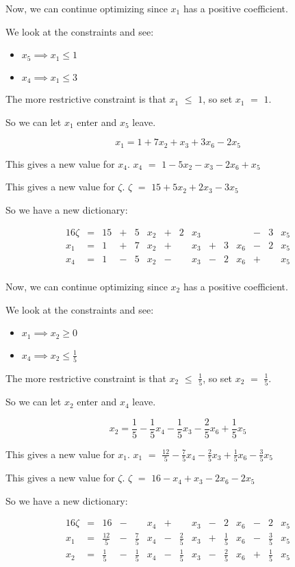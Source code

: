 \documentclass[12pt,letterpaper]{article}
\newcommand*\continueopt[1]{
  Now, we can continue optimizing since #1 has a positive coefficient.
}
\newcommand*\enterleave[2]{
  So we can let #1 enter and #2 leave.
}
\newcommand*\morerestrictive[2]{
  The more restrictive constraint is that #1 $\leq$ #2, so set #1 $=$ #2.
}
\newcommand*\newdict{
  So we have a new dictionary:
}
\newcommand*\newvalue[2]{
  This gives a new value for #1. #1 $ = $ #2
}
\begin{document}
\begin{enumerate}
      \continueopt{$x_1$}

      We look at the constraints and see:
      \begin{itemize}
        \item $x_5 \implies x_1 \leq 1$
        \item $x_4 \implies x_1 \leq 3$
      \end{itemize}

      \morerestrictive{$x_1$}{$1$}

      \enterleave{$x_1$}{$x_5$}

      \[
        x_1 = 1 + 7x_2 + x_3 + 3x_6 - 2x_5
      \]

      \newvalue{$x_4$}{$1 - 5x_2 - x_3 - 2x_6 + x_5$}

      \newvalue{$\zeta$}{$15 + 5x_2 + 2x_3 - 3x_5$}

      \newdict

      \begin{alignat*}{16}
        \zeta & {}={} & 15 & {}+{} & 5 & x_2 & {}+{} & 2 & x_3 &       &   &     & {}-{} & 3 & x_5 \\
        x_1   & {}={} & 1  & {}+{} & 7 & x_2 & {}+{} &   & x_3 & {}+{} & 3 & x_6 & {}-{} & 2 & x_5 \\
        x_4   & {}={} & 1  & {}-{} & 5 & x_2 & {}-{} &   & x_3 & {}-{} & 2 & x_6 & {}+{} &   & x_5 \\
      \end{alignat*}

      \continueopt{$x_2$}

      We look at the constraints and see:
      \begin{itemize}
        \item $x_1 \implies x_2 \geq 0$
        \item $x_4 \implies x_2 \leq \frac{1}{5}$
      \end{itemize}

      \morerestrictive{$x_2$}{$\frac{1}{5}$}

      \enterleave{$x_2$}{$x_4$}

      \[
        x_2 = \frac{1}{5} - \frac{1}{5}x_4 - \frac{1}{5}x_3 - \frac{2}{5}x_6 + \frac{1}{5}x_5
      \]

      \newvalue{$x_1$}{$\frac{12}{5} - \frac{7}{5}x_4 - \frac{2}{5}x_3 + \frac{1}{5}x_6 - \frac{3}{5}x_5$}

      \newvalue{$\zeta$}{$16 - x_4 + x_3 - 2x_6 - 2x_5$}

      \newdict

      \begin{alignat*}{16}
        \zeta & {}={} & 16           & {}-{} &             & x_4 & {}+{} &             & x_3 & {}-{} & 2           & x_6 & {}-{} & 2            & x_5 \\
        x_1   & {}={} & \frac{12}{5} & {}-{} & \frac{7}{5} & x_4 & {}-{} & \frac{2}{5} & x_3 & {}+{} & \frac{1}{5} & x_6 & {}-{} & \frac{3}{5} & x_5 \\
        x_2   & {}={} & \frac{1}{5}  & {}-{} & \frac{1}{5} & x_4 & {}-{} & \frac{1}{5} & x_3 & {}-{} & \frac{2}{5} & x_6 & {}+{} & \frac{1}{5} & x_5 \\
      \end{alignat*}


\end{enumerate}
\end{document}
